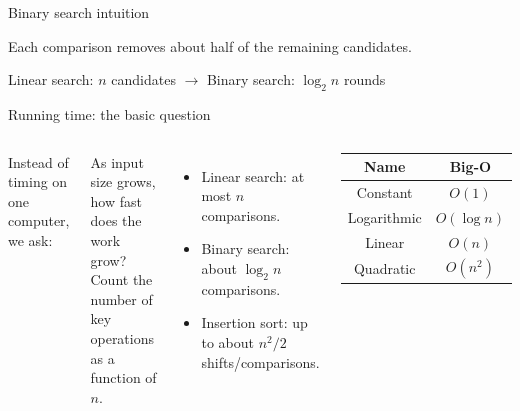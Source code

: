\documentclass[aspectratio=43,10pt]{beamer}
\begin{document}
\begin{frame}{Binary search intuition}
  \begin{center}
  \end{center}

  \vspace{0.5em}
  Each comparison removes about half of the remaining candidates.

  \vspace{0.5em}
  \begin{center}
    Linear search: $n$ candidates $\rightarrow$ Binary search: $\log_2 n$ rounds
  \end{center}
\end{frame}

\begin{frame}{Running time: the basic question}
  \begin{columns}[T]
      Instead of timing on one computer, we ask:
      \begin{block}{As input size grows,\\how fast does the work grow?}
      Count the number of key operations as a function of $n$.
      \end{block}
      \begin{itemize}
        \item Linear search: at most $n$ comparisons.
        \item Binary search: about $\log_2 n$ comparisons.
        \item Insertion sort: up to about $n^2/2$ shifts/comparisons.
      \end{itemize}
      \begin{center}
      \begin{tabular}{cc}
        \toprule
        Name & Big-O \\
        \midrule
        Constant & $O(1)$ \\
        Logarithmic & $O(\log n)$ \\
        Linear & $O(n)$ \\
        Quadratic & $O(n^2)$ \\
        \bottomrule
      \end{tabular}
      \end{center}
  \end{columns}
\end{frame}
\end{document}
